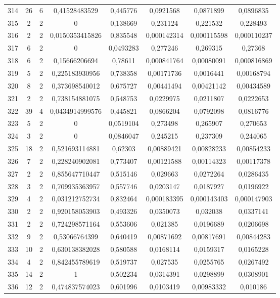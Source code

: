 \begin{longtable}{|c|c|c|c|c|c|c|c|}
314 & 26 & 6 & 0,41528483529 & 0,445776 & 0,0921568 & 0,0871899 & 0,0896835  \\
315 & 2 & 2 & 0 & 0,138669 & 0,231124 & 0,221532 & 0,228493  \\
316 & 2 & 2 & 0,0150353415826 & 0,835548 & 0,000142314 & 0,000115598 & 0,000110237  \\
317 & 6 & 2 & 0 & 0,0493283 & 0,277246 & 0,269315 & 0,27368  \\
318 & 6 & 2 & 0,15666206694 & 0,78611 & 0,000841764 & 0,00080091 & 0,000816869  \\
319 & 5 & 2 & 0,225183930956 & 0,738358 & 0,00171736 & 0,0016441 & 0,00168794  \\
320 & 8 & 2 & 0,373698540012 & 0,675727 & 0,00441494 & 0,00421142 & 0,00434589  \\
321 & 2 & 2 & 0,738154881075 & 0,548753 & 0,0229975 & 0,0211807 & 0,0222653  \\
322 & 39 & 4 & 0,0434914999576 & 0,445821 & 0,0866204 & 0,0792098 & 0,0816776  \\
323 & 5 & 2 & 0 & 0,0519104 & 0,273498 & 0,265907 & 0,270653  \\
324 & 3 & 2 & 0 & 0,0846047 & 0,245215 & 0,237309 & 0,244065  \\
325 & 18 & 2 & 0,521693114881 & 0,62303 & 0,00889421 & 0,00828233 & 0,00854233  \\
326 & 7 & 2 & 0,228240902081 & 0,773407 & 0,00121588 & 0,00114323 & 0,00117378  \\
327 & 2 & 2 & 0,855647710447 & 0,515146 & 0,029663 & 0,0272264 & 0,0286435  \\
328 & 3 & 2 & 0,709935363957 & 0,557746 & 0,0203147 & 0,0187927 & 0,0196922  \\
329 & 4 & 2 & 0,031212752734 & 0,832464 & 0,000183395 & 0,000143403 & 0,000147903  \\
330 & 2 & 2 & 0,920158053903 & 0,493326 & 0,0350073 & 0,032038 & 0,0337141  \\
331 & 2 & 2 & 0,724298571164 & 0,553606 & 0,021385 & 0,0196689 & 0,0206698  \\
332 & 9 & 2 & 0,53066764399 & 0,640419 & 0,00871692 & 0,00817691 & 0,00844283  \\
333 & 10 & 2 & 0,630138382028 & 0,580588 & 0,0168114 & 0,0159317 & 0,0165228  \\
334 & 4 & 2 & 0,842455789619 & 0,519737 & 0,027535 & 0,0255765 & 0,0267492  \\
335 & 14 & 2 & 1 & 0,502234 & 0,0314391 & 0,0298899 & 0,0308901  \\
336 & 12 & 2 & 0,474837574023 & 0,601996 & 0,0103419 & 0,00983332 & 0,010186  \\

\end{longtable}
